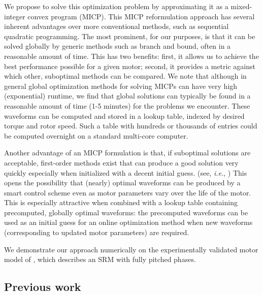 \documentclass[11pt]{article}
\newcommand{\ie}{{\it i.e.}}
\begin{document}
We propose to solve this optimization problem
by approximating it as a mixed-integer convex program (MICP).
This MICP reformulation approach has several inherent advantages
over more conventional methods, such as sequential quadratic programming.
The most prominent, for our purposes,
is that it can be solved globally by generic
methods such as branch and bound, often in a reasonable amount of time.
This has two benefits:
first, it allows us to achieve the best performance possible for a given motor;
second, it provides a metric against which other, suboptimal methods can be compared.
We note that although in general global optimization
methods for solving MICPs can have very high (exponential) runtime,
we find that global solutions can typically be found in a reasonable
amount of time (1-5 minutes) for the problems we encounter.
These waveforms can be computed and stored in a lookup table,
indexed by desired torque and rotor speed.
Such a table with hundreds or thousands of entries
could be computed overnight on a standard multi-core computer.

Another advantage of an MICP formulation is that,
if suboptimal solutions are acceptable,
first-order methods exist that can produce a good
solution very quickly 
especially when initialized with a decent initial guess.
(see, \ie, \cite{takapoui2015simple})
This opens the possibility that (nearly) optimal waveforms can
be produced by a smart control scheme
even as motor parameters vary over the life of the motor.
This is especially attractive when combined with a lookup table
containing precomputed, globally optimal waveforms:
the precomputed waveforms can be used as an initial guess
for an online optimization method
when new waveforms (corresponding to updated motor parameters) are required.

We demonstrate our approach numerically on the experimentally validated 
motor model of \cite{mecrow2001modeling},
which describes an SRM with fully pitched phases.

\subsection{Previous work}
\end{document}
